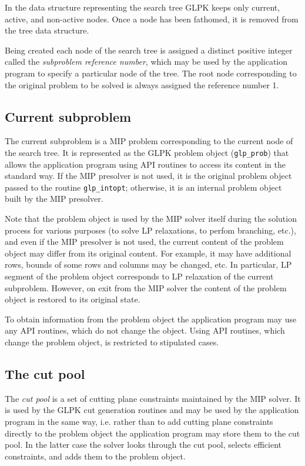 In the data structure representing the search tree GLPK keeps only
current, active, and non-active nodes. Once a node has been fathomed,
it is removed from the tree data structure.

Being created each node of the search tree is assigned a distinct
positive integer called the {\it subproblem reference number}, which
may be used by the application program to specify a particular node of
the tree. The root node corresponding to the original problem to be
solved is always assigned the reference number 1.

\subsection{Current subproblem}

The current subproblem is a MIP problem corresponding to the current
node of the search tree. It is represented as the GLPK problem object
(\verb|glp_prob|) that allows the application program using API
routines to access its content in the standard way. If the MIP
presolver is not used, it is the original problem object passed to the
routine \verb|glp_intopt|; otherwise, it is an internal problem object
built by the MIP presolver.

Note that the problem object is used by the MIP solver itself during
the solution process for various purposes (to solve LP relaxations, to
perfom branching, etc.), and even if the MIP presolver is not used, the
current content of the problem object may differ from its original
content. For example, it may have additional rows, bounds of some rows
and columns may be changed, etc. In particular, LP segment of the
problem object corresponds to LP relaxation of the current subproblem.
However, on exit from the MIP solver the content of the problem object
is restored to its original state.

To obtain information from the problem object the application program
may use any API routines, which do not change the object. Using API
routines, which change the problem object, is restricted to stipulated
cases.

\subsection{The cut pool}

The {\it cut pool} is a set of cutting plane constraints maintained by
the MIP solver. It is used by the GLPK cut generation routines and may
be used by the application program in the same way, i.e. rather than
to add cutting plane constraints directly to the problem object the
application program may store them to the cut pool. In the latter case
the solver looks through the cut pool, selects efficient constraints,
and adds them to the problem object.

